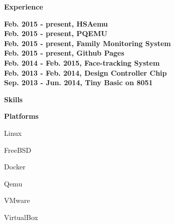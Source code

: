 \documentclass[a4paper,12pt,final]{memoir}
\newcommand{\Sep}{\vspace{1.5em}}
\newcommand{\SmallSep}{\vspace{0.5em}}
\newcommand{\CVSection}[1]
	{\Large\textbf{#1}\par
	\SmallSep\normalsize\normalfont}
\newcommand{\CVItem}[1]
	{\textbf{\color{RoyalBlue} #1}}
\begin{document}
\CVSection{Experience}
\CVItem{Feb. 2015 - present, HSAemu}\\
\SmallSep
\CVItem{Feb. 2015 - present, PQEMU}\\
\SmallSep
\CVItem{Feb. 2015 - present, Family Monitoring System}\\
\SmallSep
\CVItem{Feb. 2015 - present, Github Pages}\\
\SmallSep
\CVItem{Feb. 2014 - Feb. 2015, Face-tracking System}\\
\SmallSep
\CVItem{Feb. 2013 - Feb. 2014, Design Controller Chip}\\
\SmallSep
\CVItem{Sep. 2013 - Jun. 2014, Tiny Basic on 8051}\\
\Sep


\CVSection{Skills}
\CVItem{Platforms}
\begin{multicols}{3}
\begin{compactitem}[\color{RoyalBlue}$\circ$]
	\item Linux
	\item FreeBSD 
	\item Docker
	\item Qemu
	\item VMware
	\item VirtualBox
\end{compactitem}
\end{multicols}
\SmallSep
\end{document}
